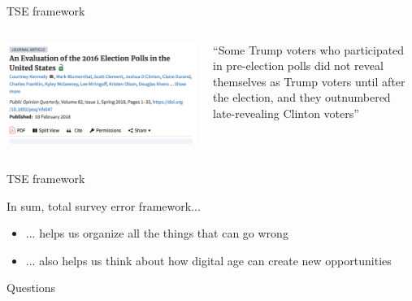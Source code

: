 \documentclass[aspectratio=169]{beamer}
\begin{document}
\begin{frame}{TSE framework}

\begin{columns}[T]

\begin{column}{0.48\textwidth}
\begin{center}
\includegraphics[width=\textwidth]{figures/aapor-2016.png}
\end{center}
\end{column}

\begin{column}{0.48\textwidth}
\vspace{1em}
``Some Trump voters who participated in pre-election polls did not reveal themselves as Trump voters until after the election, and they outnumbered late-revealing Clinton voters''  \\
\vspace{1em}

\end{column}

\end{columns}



\end{frame}
\begin{frame}{TSE framework}

In sum, total survey error framework...
\begin{itemize}
\item ... helps us organize all the things that can go wrong
\pause
\item ... also helps us think about how digital age can create new opportunities
\end{itemize}

\end{frame}
\begin{frame}

\begin{center}
\Large Questions
\end{center}

\end{frame}
\end{document}
